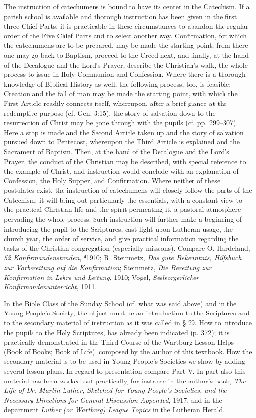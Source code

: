 The instruction of catechumens is bound to have its center in the Catechism. If a parish school is available and thorough instruction has been given in the first three Chief Parts, it is practicable in these circumstances to abandon the regular order of the Five Chief Parts and to select another way. Confirmation, for which the catechumens are to be prepared, may be made the starting point; from there one may go back to Baptism, proceed to the Creed next, and finally, at the hand of the Decalogue and the Lord’s Prayer, describe the Christian’s walk, the whole process to issue in Holy Communion and Confession. Where there is a thorough knowledge of Biblical History as
well, the following process, too, is feasible: Creation and the fall of man may be made the starting point, with which the First Article readily connects itself, whereupon, after a brief glance at the redemptive purpose (cf. Gen. 3:15), the story of salvation down to the resurrection of Christ may be gone through with the pupils (cf. pp. 299–307). Here a stop is made and the Second Article taken up and the story of salvation pursued down to Pentecost, whereupon the Third Article is explained and the Sacrament of Baptism. Then, at the hand of the Decalogue and the Lord’s Prayer, the conduct of the Christian may be described, with special reference to the example of Christ, and instruction would conclude with an explanation of Confession, the Holy Supper, and Confirmation. Where neither of these postulates exist, the instruction of catechumens will closely follow the parts of the Catechism: it will bring out particularly the essentials, with a constant view to the practical Christian life and the spirit permeating it, a pastoral atmosphere pervading the whole process. Such instruction will further make a beginning of introducing the pupil to the Scriptures, cast light upon Lutheran usage, the church year, the order of service, and give practical information regarding the tasks of the Christian congregation (especially missions). Compare O. Hardeland, \emph{52 Konfirmandenstunden}, ⁴1910; R. Steinmetz, \emph{Das gute Bekenntnis, Hilfsbuch zur Vorbereitung auf die Konfirmation}; Steinmetz, \emph{Die Bereitung zur Konfirmation in Lehre und Leitung}, 1910; Vogel, \emph{Seelsorgerlicher Konfirmandenunterricht}, 1911.

In the Bible Class of the Sunday School (cf. what was said above) and in the Young People’s Society, the object must be an introduction to the Scriptures and to the secondary material of instruction as it was called in § 29. How to introduce the pupils to the Holy Scriptures, has already been indicated (p. 372); it is practically demonstrated in the Third Course of the Wartburg Lesson Helps (Book of Books; Book
of Life), composed by the author of this textbook. How the secondary material is to be used in Young People’s Societies we show by adding several lesson plans. In regard to presentation compare Part V. In part also this material has been worked out practically, for instance in the author’s book, \emph{\emph{The Life of Dr. Martin Luther, Sketched for Young People’s Societies, and the Necessary Directions for General Discussion Appended}}, 1917, and in the department \emph{Luther (or Wartburg) League Topics} in the Lutheran Herald.

